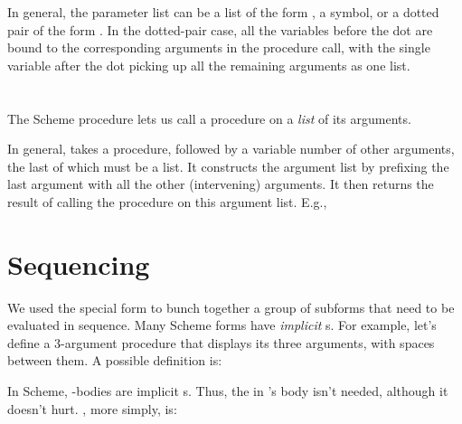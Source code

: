 In general, the  parameter list can be a list
of the form , a symbol, or a dotted pair of
the form .  In the dotted-pair case, all
the variables before the dot are bound to the
corresponding arguments in the procedure call, with the
single variable after the dot picking up all the
remaining arguments as one list.


\section{}

The Scheme procedure  lets us call a procedure
on a {\em list} of its arguments.


In general,  takes a procedure, followed by a
variable number of other arguments, the last of which
must be a list.  It constructs the argument list by
prefixing the last argument with all the other
(intervening) arguments.  It then returns the result of
calling the procedure
on this argument list.  E.g.,



\section{Sequencing}

We used the  special form to bunch together a
group of subforms that need to be evaluated in
sequence.  Many Scheme forms have {\em implicit}
s.  For example, let’s define a 3-argument procedure that
displays its three arguments, with spaces between
them.  A possible definition is:



In Scheme, -bodies are implicit s.
Thus, the  in ’s body isn’t needed, although it doesn’t
hurt.  , more simply, is:

